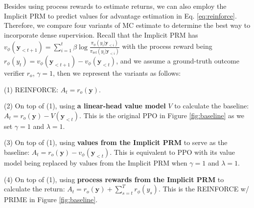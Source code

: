 Besides using process rewards to estimate returns, we can also employ the Implicit PRM to predict values for advantage estimation in Eq. \ref{eq:reinforce}.
Therefore, we compare four variants of MC estimate to determine the best way to incorporate dense supervision.
Recall that the Implicit PRM has $v_{\phi}(\mathbf{y}_{<t+1}) = \sum_{i=1}^{t} \beta \log \frac{\pi_\phi(y_{i}|\mathbf{y}_{<i})}{\pi_\text{ref}(y_{i}|\mathbf{y}_{<i})}$ with the process reward being $r_{\phi}(y_t) = v_{\phi}(\mathbf{y}_{<t+1}) - v_{\phi}(\mathbf{y}_{<t})$, and we assume a ground-truth outcome verifier $r_o$, $\gamma=1$, then we represent the variants as follows:

(1) REINFORCE: $A_t = r_o(\mathbf{y})$.

(2) On top of (1), using \textbf{a linear-head value model} $V$ to calculate the baseline: $A_t = r_o(\mathbf{y}) - V(\mathbf{y}_{<t})$. This is the original PPO in Figure \ref{fig:baseline} as we set $\gamma=1$ and $\lambda=1$.

(3) On top of (1), using \textbf{values from the Implicit PRM} to serve as the baseline: $A_t = r_o(\mathbf{y}) - v_\phi(\mathbf{y}_{<t})$. This is equivalent to PPO with its value model being replaced by values from the Implicit PRM when $\gamma=1$ and $\lambda=1$.

(4) On top of (1), using \textbf{process rewards from the Implicit PRM} to calculate the return: $A_t = r_o(\mathbf{y}) + \sum_{s=t}^T r_{\phi}(y_s) $. This is the REINFORCE w/ PRIME in Figure \ref{fig:baseline}.










